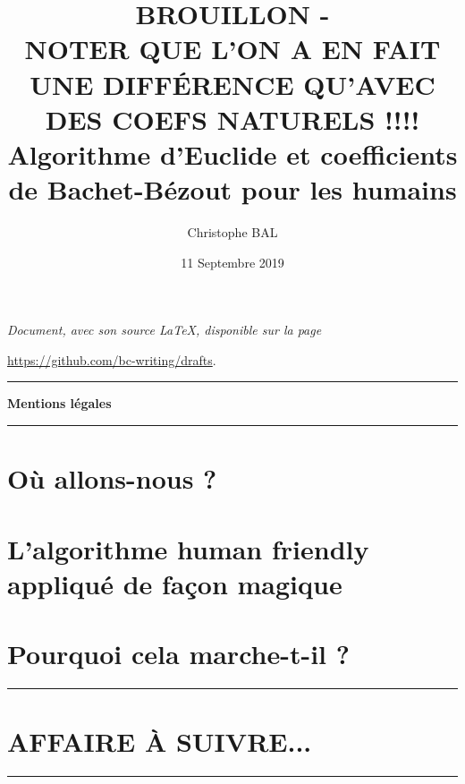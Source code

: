 \documentclass[12pt]{amsart}
\newcommand\myquote[1]{\emph{\og #1 \fg}}
\begin{document}
\title{BROUILLON - \\NOTER QUE L'ON A EN FAIT UNE DIFFÉRENCE QU'AVEC DES COEFS NATURELS !!!! \\Algorithme d'Euclide et coefficients de Bachet-Bézout pour les humains}
\author{Christophe BAL}
\date{11 Septembre 2019}

\maketitle

\begin{center}
    \itshape
    Document, avec son source \LaTeX, disponible sur la page
    
    \url{https://github.com/bc-writing/drafts}.
\end{center}


\bigskip


\begin{center}
    \hrule\vspace{.3em}
    {
        \fontsize{1.35em}{1em}\selectfont
        \textbf{Mentions \og légales \fg}
    }
            
    \vspace{0.45em}
    \doclicenseThis
    \hrule
\end{center}


\setcounter{tocdepth}{2}
\tableofcontents




\section{Où allons-nous ?}






\section{L'algorithme \og human friendly \fg{} appliqué de façon magique}






\section{Pourquoi cela marche-t-il ?}







%

\bigskip

\hrule

\section{AFFAIRE À SUIVRE...}

\bigskip

\hrule
\end{document}
